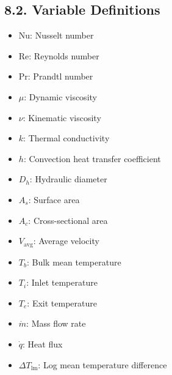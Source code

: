 \documentclass[10pt]{article}
\begin{document}
\begin{multicols*}{2}
\subsection*{8.2. Variable Definitions}
\begin{itemize}
    \item Nu: Nusselt number
    \item Re: Reynolds number
    \item Pr: Prandtl number
    \item $\mu$: Dynamic viscosity
    \item $\nu$: Kinematic viscosity
    \item $k$: Thermal conductivity
    \item $h$: Convection heat transfer coefficient
    \item $D_h$: Hydraulic diameter
    \item $A_s$: Surface area
    \item $A_c$: Cross-sectional area
    \item $V_{\text{avg}}$: Average velocity
    \item $T_b$: Bulk mean temperature
    \item $T_i$: Inlet temperature
    \item $T_e$: Exit temperature
    \item $\dot{m}$: Mass flow rate
    \item $\dot{q}$: Heat flux 
    \item $\Delta T_{\text{lm}}$: Log mean temperature difference   
\end{itemize}


\end{multicols*}
\end{document}
